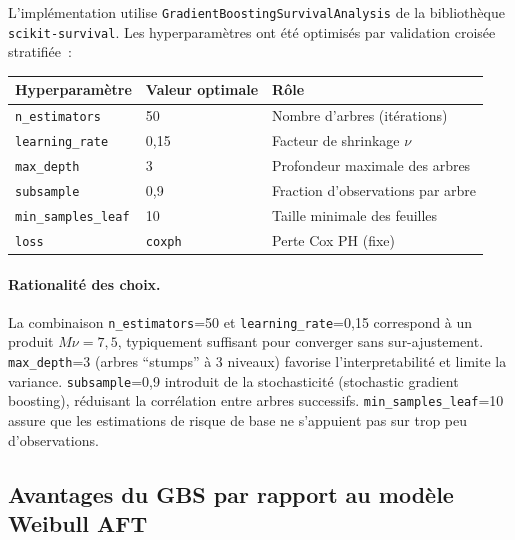 \documentclass[a4paper,11pt]{article}
\begin{document}
L'implémentation utilise \texttt{GradientBoostingSurvivalAnalysis} de la bibliothèque
\texttt{scikit-survival}. Les hyperparamètres ont été optimisés par validation croisée
stratifiée~:

\begin{center}
\begin{tabular}{lll}
\toprule
\textbf{Hyperparamètre} & \textbf{Valeur optimale} & \textbf{Rôle} \\
\midrule
\texttt{n\_estimators} & 50 & Nombre d'arbres (itérations) \\
\texttt{learning\_rate} & 0,15 & Facteur de shrinkage $\nu$ \\
\texttt{max\_depth} & 3 & Profondeur maximale des arbres \\
\texttt{subsample} & 0,9 & Fraction d'observations par arbre \\
\texttt{min\_samples\_leaf} & 10 & Taille minimale des feuilles \\
\midrule
\texttt{loss} & \texttt{coxph} & Perte Cox PH (fixe) \\
\bottomrule
\end{tabular}
\end{center}

\paragraph{Rationalité des choix.} La combinaison \texttt{n\_estimators}=50 et
\texttt{learning\_rate}=0,15 correspond à un produit $M\nu = 7{,}5$, typiquement suffisant pour
converger sans sur-ajustement. \texttt{max\_depth}=3 (arbres ``stumps'' à 3 niveaux) favorise
l'interpretabilité et limite la variance. \texttt{subsample}=0,9 introduit de la stochasticité
(stochastic gradient boosting), réduisant la corrélation entre arbres successifs.
\texttt{min\_samples\_leaf}=10 assure que les estimations de risque de base ne s'appuient pas sur
trop peu d'observations.

\subsection{Avantages du GBS par rapport au modèle Weibull AFT}
\end{document}
